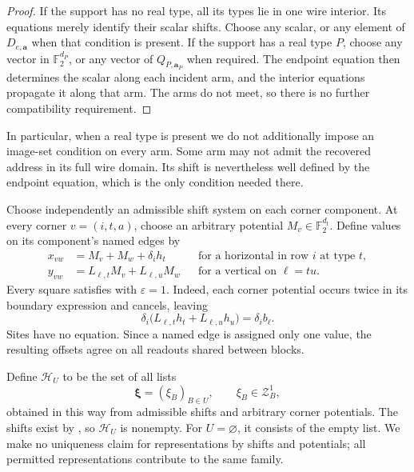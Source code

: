 \documentclass[11pt]{article}
\theoremstyle{definition}
\begin{document}
\begin{proof}
If the support has no real type, all its types lie in one wire interior.
Its equations merely identify their scalar shifts. Choose any scalar,
or any element of \(D_{e,\mathbf a}\) when that condition is present.
If the support has a real type \(P\), choose any vector in
\(\mathbb F_2^{d_P}\), or any vector of \(Q_{P,\mathbf a_P}\) when required.
The endpoint equation then determines the scalar along each incident
arm, and the interior equations propagate it along that arm. The arms
do not meet, so there is no further compatibility requirement.
\end{proof}

In particular, when a real type is present we do not additionally impose
an image-set condition on every arm. Some arm may not admit the
recovered address in its full wire domain. Its shift is nevertheless
well defined by the endpoint equation, which is the only condition
needed there.

Choose independently an admissible shift system on each corner
component. At every corner \(v=(i,t,a)\), choose an arbitrary potential
\(M_v\in\mathbb F_2^{d_t}\). Define values on its component's named edges by
\begin{equation}
\begin{aligned}
 x_{vw}&=M_v+M_w+\delta_i h_t
 &&\text{for a horizontal in row \(i\) at type \(t\)},\\
 y_{vw}&=L_{\ell,t}M_v+L_{\ell,u}M_w
 &&\text{for a vertical on \(\ell=tu\)}.
\end{aligned}
\label{offset:eq-potentials}
\end{equation}
Every square satisfies  with \(\varepsilon=1\).
Indeed, each corner potential occurs twice in its boundary expression
and cancels, leaving
\[
 \delta_i\bigl(L_{\ell,t}h_t+L_{\ell,u}h_u\bigr)
       =\delta_i b_\ell.
\]
Sites have no equation. Since a named edge is assigned only one value,
the resulting offsets agree on all readouts shared between blocks.

Define \(\mathcal H_U\) to be the set of all lists
\[
  \boldsymbol\xi=(\xi_B)_{B\in U},
  \qquad \xi_B\in\mathcal Z_B^1,
\]
obtained in this way from admissible shifts and arbitrary corner
potentials. The shifts exist by , so
\(\mathcal H_U\) is nonempty. For \(U=\varnothing\), it consists of the empty
list. We make no uniqueness claim for representations by shifts and
potentials; all permitted representations contribute to the same family.
\end{document}
